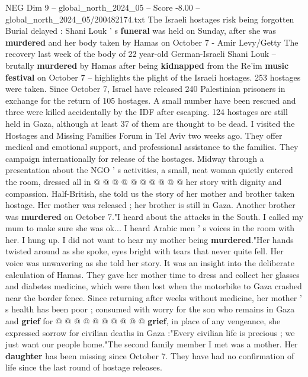 \begin{textsample}{NEG Dim 9 – global\_north\_2024\_05 – Score -8.00 – global\_north\_2024\_05/200482174.txt}  \label{ex:f9_neg_234}
The Israeli hostages risk being forgotten Burial delayed : Shani Louk ' s \textbf{funeral} was held on Sunday, after she was \textbf{murdered} and her body taken by Hamas on October 7 - Amir Levy/Getty The recovery last week of the body of 22 year-old German-Israeli Shani Louk -- brutally \textbf{murdered} by Hamas after being \textbf{kidnapped} from the Re'im \textbf{music} \textbf{festival} on October 7 -- highlights the plight of the Israeli hostages. 253 hostages were taken.
Since October 7, Israel have released 240 Palestinian prisoners in exchange for the return of 105 hostages.
A small number have been rescued and three were killed accidentally by the IDF after escaping. 124 hostages are still held in Gaza, although at least 37 of them are thought to be dead.
I visited the Hostages and Missing Families Forum in Tel Aviv two weeks ago.
They offer medical and emotional support, and professional assistance to the families.
They campaign internationally for release of the hostages.
Midway through a presentation about the NGO ' s activities, a small, neat woman quietly entered the room, dressed all in @ @ @ @ @ @ @ @ @ @ her story with dignity and compassion.
Half-British, she told us the story of her mother and brother taken hostage.
Her mother was released ; her brother is still in Gaza.
Another brother was \textbf{murdered} on October 7."I heard about the attacks in the South.
I called my mum to make sure she was ok...
I heard Arabic men ' s voices in the room with her.
I hung up.
I did not want to hear my mother being \textbf{murdered}."Her hands twisted around as she spoke, eyes bright with tears that never quite fell.
Her voice was unwavering as she told her story.
It was an insight into the deliberate calculation of Hamas.
They gave her mother time to dress and collect her glasses and diabetes medicine, which were then lost when the motorbike to Gaza crashed near the border fence.
Since returning after weeks without medicine, her mother ' s health has been poor ; consumed with worry for the son who remains in Gaza and \textbf{grief} for @ @ @ @ @ @ @ @ @ @ \textbf{grief}, in place of any vengeance, she expressed sorrow for civilian deaths in Gaza :"Every civilian life is precious ; we just want our people home."The second family member I met was a mother.
Her \textbf{daughter} has been missing since October 7.
They have had no confirmation of life since the last round of hostage releases.

\end{textsample}

